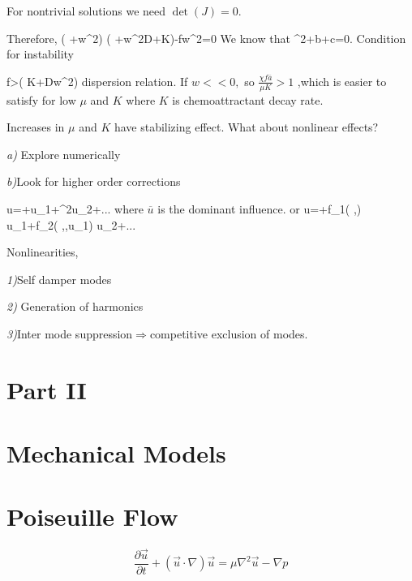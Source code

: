 \documentclass[]{article}
\numberwithin{equation}{section}		%
\let\[\equation
\let\]\endequation
\begin{document}
For nontrivial solutions we need $\det (J)=0.$

Therefore, 
\[
\left( \lambda +\mu w^{2}\right) \left( \chi +w^{2}D+K\right)-f\chi {}w^{2}=0
\]
\indent We know that
\[ 
\lambda ^{2}+b\lambda +c=0.
\]
\indent Condition for instability

\[ 
\chi f>\mu \left( K+Dw^{2}\right)  
\]
dispersion relation.
If $w<<0,$ so $\frac{\chi f\overline{a}}{\mu K}>1$ ,which is easier to
satisfy for low $\mu $ and $K$ where $K$ is chemoattractant decay rate.

Increases in $\mu $ and $K$ have stabilizing effect. What about nonlinear
effects?

\textit{a) }Explore numerically

\textit{b)}Look for higher order corrections

\[
 u=+\varepsilon u_{1}+\varepsilon ^{2}u_{2+...}
\]
where $\overline{u}$ is the dominant influence.
or
\[
u=+f_{1}\left( \varepsilon ,\right)
u_{1}+f_{2}\left( \varepsilon ,,u_{1}\right) u_{2+...}
\]

\newpage
Nonlinearities,

\textit{1)}Self damper modes

\textit{2)} Generation of harmonics

\textit{3)}Inter mode suppression$\Longrightarrow $competitive exclusion of
modes.



\newpage
\section*{Part II}
\section{Mechanical Models}

\section{Poiseuille Flow}

\begin{equation}\label{momentum}
	\frac{\partial \vec{u}}{\partial t} + (\vec{u}\cdot \nabla) \vec{u} = \mu \nabla^2 \vec{u} - \nabla p
\end{equation}
\end{document}
